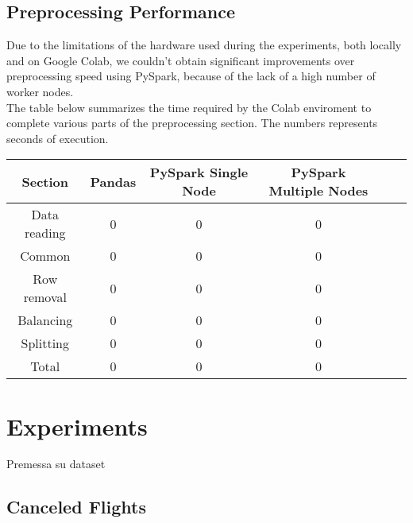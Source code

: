 \documentclass[
	letterpaper, %
	10pt, %
]{class}
\begin{document}
\subsection{Preprocessing Performance}

Due to the limitations of the hardware used during the experiments, both locally and on Google Colab, we couldn't obtain significant improvements over preprocessing speed using PySpark, because of the lack of a high number of worker nodes.\\

The table below summarizes the time required by the Colab enviroment to complete various parts of the preprocessing section.
The numbers represents seconds of execution.

\begin{center}
	\begin{tabular}{ |c|c|c|c|c|c| }
		\hline
		Section      & Pandas & PySpark Single Node & PySpark Multiple Nodes \\
		\hline
		Data reading & 0      & 0                   & 0                      \\
		Common       & 0      & 0                   & 0                      \\
		Row removal  & 0      & 0                   & 0                      \\
		Balancing    & 0      & 0                   & 0                      \\
		Splitting    & 0      & 0                   & 0                      \\
		Total        & 0      & 0                   & 0                      \\

		\hline
	\end{tabular}
\end{center}


\section{Experiments}

Premessa su dataset

\subsection{Canceled Flights}
\end{document}
